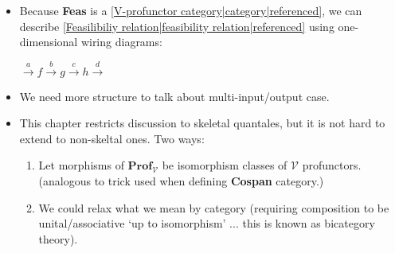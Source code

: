 \begin{itemize}
    \item Because \textbf{Feas} is a \ref{V-profunctor category|category|referenced}, we can describe \ref{Feasilibiliy relation|feasibility relation|referenced} using one-dimensional wiring diagrams:

          $\xrightarrow{a}\boxed{f}\xrightarrow{b}\boxed{g}\xrightarrow{c}\boxed{h}\xrightarrow{d}$
    \item We need more structure to talk about multi-input/output case.
    \item This chapter restricts discussion to skeletal quantales, but it is not hard to extend to non-skeltal ones. Two ways:
          \begin{enumerate}
            \item Let morphisms of $\mathbf{Prof}_\mathcal{V}$ be isomorphism classes of $\mathcal{V}$ profunctors. (analogous to trick used when defining \textbf{Cospan} category.)
            \item We could relax what we mean by category (requiring composition to be unital/associative `up to isomorphism' ... this is known as bicategory theory).
          \end{enumerate}
  \end{itemize}
